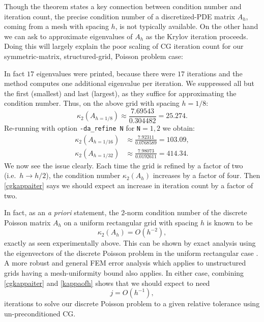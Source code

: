 Though the theorem states a key connection between condition number and iteration count, the precise condition number of a discretized-PDE matrix $A_h$, coming from a mesh with spacing $h$, is not typically available.  On the other hand we can ask \PETSc to approximate eigenvalues of $A_h$ as the Krylov iteration proceeds.  Doing this will largely explain the poor scaling of CG iteration count for our symmetric-matrix, structured-grid, Poisson problem case:
In fact $17$ eigenvalues were printed, because there were $17$ \pKSP iterations and the method computes one additional eigenvalue per iteration.  We suppressed all but the first (smallest) and last (largest), as they suffice for approximating the condition number.  Thus, on the above grid with spacing $h=1/8$:
    $$\kappa_2(A_{h=1/8}) \approx \frac{7.69543}{0.304482} = 25.274.$$
Re-running with option \texttt{-da\_refine N} for \texttt{N}$=1,2$ we obtain:
\begin{align*}
    \kappa_2(A_{h=1/16}) &\approx \frac{7.92311}{0.0768589} = 103.09, \\
    \kappa_2(A_{h=1/32}) &\approx \frac{7.98073}{0.0192611} = 414.34.
\end{align*}
We now see the issue clearly.  Each time the grid is refined by a factor of two (i.e.~$h\to h/2$), the condition number $\kappa_2(A_h)$ increases by a factor of four.  Then \eqref{cgkappaiter} says we should expect an increase in iteration count by a factor of two.

In fact, as an \emph{a priori} statement, the $2$-norm condition number of the discrete Poisson matrix $A_h$ on a uniform rectangular grid with spacing $h$ is known to be
\begin{equation}
    \kappa_2(A_h) = O(h^{-2}), \label{kappaofh}
\end{equation}
exactly as seen experimentally above.  This can be shown by exact analysis using the eigenvectors of the discrete Poisson problem in the uniform rectangular case \citep{Briggsetal2000}.  A more robust and general FEM error analysis which applies to unstructured grids having a mesh-uniformity bound \citep{Elmanetal2005} also applies.  In either case, combining \eqref{cgkappaiter} and \eqref{kappaofh} shows that we should expect to need
\begin{equation}
    j = O(h^{-1}), \label{kofh}
\end{equation}
iterations to solve our discrete Poisson problem to a given relative tolerance using un-preconditioned CG.

